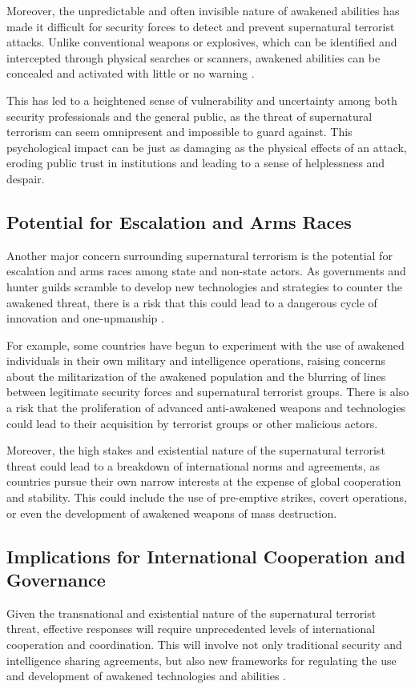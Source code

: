 \documentclass[12pt, a4paper]{article}
\begin{document}
Moreover, the unpredictable and often invisible nature of awakened abilities has made it difficult for security forces to detect and prevent supernatural terrorist attacks. Unlike conventional weapons or explosives, which can be identified and intercepted through physical searches or scanners, awakened abilities can be concealed and activated with little or no warning \citep{Hoffman2026}.

This has led to a heightened sense of vulnerability and uncertainty among both security professionals and the general public, as the threat of supernatural terrorism can seem omnipresent and impossible to guard against. This psychological impact can be just as damaging as the physical effects of an attack, eroding public trust in institutions and leading to a sense of helplessness and despair.

\subsection{Potential for Escalation and Arms Races}
Another major concern surrounding supernatural terrorism is the potential for escalation and arms races among state and non-state actors. As governments and hunter guilds scramble to develop new technologies and strategies to counter the awakened threat, there is a risk that this could lead to a dangerous cycle of innovation and one-upmanship \citep{Chen2028}.

For example, some countries have begun to experiment with the use of awakened individuals in their own military and intelligence operations, raising concerns about the militarization of the awakened population and the blurring of lines between legitimate security forces and supernatural terrorist groups. There is also a risk that the proliferation of advanced anti-awakened weapons and technologies could lead to their acquisition by terrorist groups or other malicious actors.

Moreover, the high stakes and existential nature of the supernatural terrorist threat could lead to a breakdown of international norms and agreements, as countries pursue their own narrow interests at the expense of global cooperation and stability. This could include the use of pre-emptive strikes, covert operations, or even the development of awakened weapons of mass destruction.

\subsection{Implications for International Cooperation and Governance}
Given the transnational and existential nature of the supernatural terrorist threat, effective responses will require unprecedented levels of international cooperation and coordination. This will involve not only traditional security and intelligence sharing agreements, but also new frameworks for regulating the use and development of awakened technologies and abilities \citep{Muller2027}.
\end{document}
